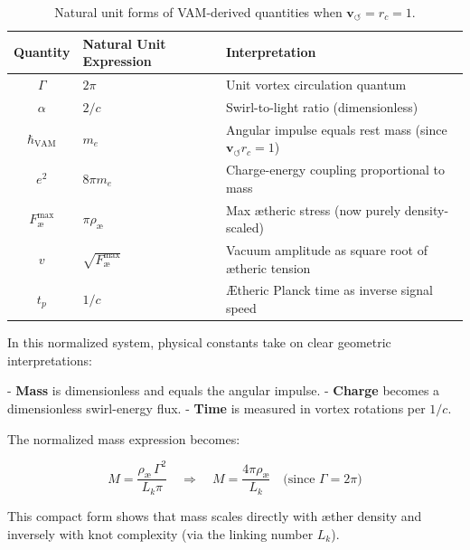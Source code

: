 \documentclass[12pt]{article}
\begin{document}
\begin{table}[H]
    \centering
    \footnotesize
    \renewcommand{\arraystretch}{1.3}
    \begin{tabular}{|c|l|l|}
        \hline
        \textbf{Quantity} & \textbf{Natural Unit Expression} & \textbf{Interpretation} \\
        \hline
        \( \Gamma \) & \( 2\pi \) & Unit vortex circulation quantum \\
        \hline
        \( \alpha \) & \( 2 / c \) & Swirl-to-light ratio (dimensionless) \\
        \hline
        \( \hbar_{\text{VAM}} \) & \( m_e \) & Angular impulse equals rest mass (since \( \mathbf{v}_{\scriptscriptstyle\boldsymbol{\circlearrowleft}} r_c = 1 \)) \\
        \hline
        \( e^2 \) & \( 8\pi m_e \) & Charge-energy coupling proportional to mass \\
        \hline
        \( F^{\text{max}}_{\text{\ae}} \) & \( \pi \rho_\text{\ae} \) & Max ætheric stress (now purely density-scaled) \\
        \hline
        \( v \) & \( \sqrt{F^{\text{max}}_{\text{\ae}}} \) & Vacuum amplitude as square root of ætheric tension \\
        \hline
        \( t_p \) & \( 1/c \) & Ætheric Planck time as inverse signal speed \\
        \hline
    \end{tabular}
    \caption{Natural unit forms of VAM-derived quantities when \( \mathbf{v}_{\scriptscriptstyle\boldsymbol{\circlearrowleft}} = r_c = 1 \).}
    \label{tab:natural_units_vam}
\end{table}

\noindent In this normalized system, physical constants take on clear geometric interpretations:

- \textbf{Mass} is dimensionless and equals the angular impulse.
- \textbf{Charge} becomes a dimensionless swirl-energy flux.
- \textbf{Time} is measured in vortex rotations per \( 1/c \).

The normalized mass expression becomes:

\[
M = \frac{\rho_\text{\ae} \, \Gamma^2}{L_k \pi}
\quad \Rightarrow \quad
M = \frac{4\pi \rho_\text{\ae}}{L_k}
\quad \text{(since } \Gamma = 2\pi)
\]

This compact form shows that mass scales directly with æther density and inversely with knot complexity (via the linking number \( L_k \)).
\end{document}
